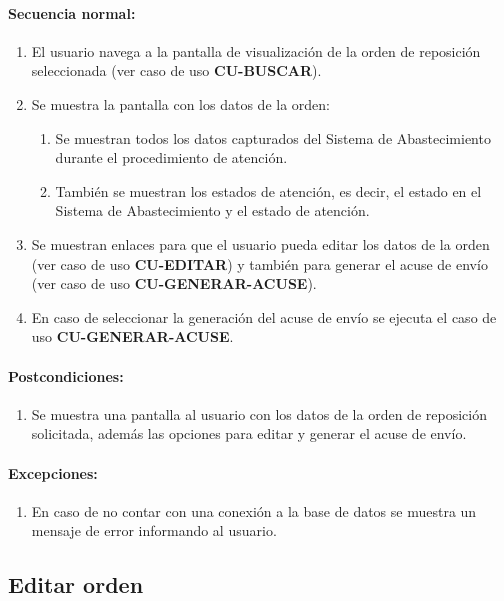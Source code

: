 \paragraph{Secuencia normal:}
\begin{enumerate}
  \item El usuario navega a la pantalla de visualización de la orden de reposición seleccionada (ver caso de uso \textbf{CU-BUSCAR}).
  \item Se muestra la pantalla con los datos de la orden:
  \begin{enumerate}
    \item Se muestran todos los datos capturados del Sistema de Abastecimiento durante el procedimiento de atención.
    \item También se muestran los estados de atención, es decir, el estado en el Sistema de Abastecimiento  y el estado de atención.
  \end{enumerate}
  \item Se muestran enlaces para que el usuario pueda editar los datos de la orden (ver caso de uso \textbf{CU-EDITAR}) y también para generar el acuse de envío (ver caso de uso \textbf{CU-GENERAR-ACUSE}).
  \item En caso de seleccionar la generación del acuse de envío se ejecuta el caso de uso \textbf{CU-GENERAR-ACUSE}.
\end{enumerate}
\paragraph{Postcondiciones:}
\begin{enumerate}
  \item Se muestra una pantalla al usuario con los datos de la orden de reposición solicitada, además las opciones para editar y generar el acuse de envío.
\end{enumerate}
\paragraph{Excepciones:}
\begin{enumerate}
  \item En caso de no contar con una conexión a la base de datos se muestra un mensaje de error informando al usuario.
\end{enumerate}


\subsection{Editar orden}\label{cu-editar}
